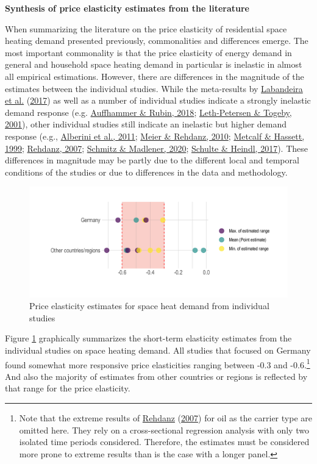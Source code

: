 \documentclass[12pt,twoside]{reedthesis}
\begin{document}
\textbf{Synthesis of price elasticity estimates from the literature}

When summarizing the literature on the price elasticity of residential space heating demand presented previously, commonalities and differences emerge. The most important commonality is that the price elasticity of energy demand in general and household space heating demand in particular is inelastic in almost all empirical estimations. However, there are differences in the magnitude of the estimates between the individual studies. While the meta-results by \protect\hyperlink{ref-labandeira_etal17}{Labandeira et al.} (\protect\hyperlink{ref-labandeira_etal17}{2017}) as well as a number of individual studies indicate a strongly inelastic demand response (e.g. \protect\hyperlink{ref-auffhammer_rubin18}{Auffhammer \& Rubin, 2018}; \protect\hyperlink{ref-leth-petersen_togeby01}{Leth-Petersen \& Togeby, 2001}), other individual studies still indicate an inelastic but higher demand response (e.g., \protect\hyperlink{ref-alberini_etal11}{Alberini et al., 2011}; \protect\hyperlink{ref-meier_rehdanz10}{Meier \& Rehdanz, 2010}; \protect\hyperlink{ref-metcalf_hassett99}{Metcalf \& Hassett, 1999}; \protect\hyperlink{ref-rehdanz07}{Rehdanz, 2007}; \protect\hyperlink{ref-schmitz_madlener20}{Schmitz \& Madlener, 2020}; \protect\hyperlink{ref-schulte_heindl17}{Schulte \& Heindl, 2017}). These differences in magnitude may be partly due to the different local and temporal conditions of the studies or due to differences in the data and methodology.
\begin{figure}

{\centering \includegraphics[width=1\linewidth]{figure/plot_literature_estimates} 

}

\caption{Price elasticity estimates for space heat demand from individual studies}\label{fig:literature-estimates-plot}
\end{figure}
Figure \ref{fig:literature-estimates-plot} graphically summarizes the short-term elasticity estimates from the individual studies on space heating demand. All studies that focused on Germany found somewhat more responsive price elasticities ranging between -0.3 and -0.6.\footnote{Note that the extreme results of \protect\hyperlink{ref-rehdanz07}{Rehdanz} (\protect\hyperlink{ref-rehdanz07}{2007}) for oil as the carrier type are omitted here. They rely on a cross-sectional regression analysis with only two isolated time periods considered. Therefore, the estimates must be considered more prone to extreme results than is the case with a longer panel.} And also the majority of estimates from other countries or regions is reflected by that range for the price elasticity.
\end{document}

